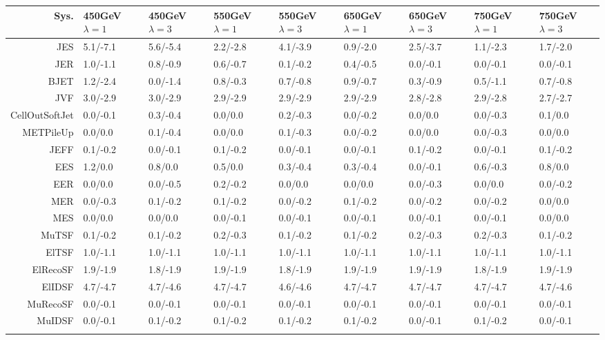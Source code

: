 \begin{tabular}{r|p{.08\linewidth}p{.08\linewidth}p{.08\linewidth}p{.08\linewidth}p{.08\linewidth}p{.08\linewidth}p{.08\linewidth}p{.08\linewidth}}
\toprule
 Sys.  & 450GeV $\lambda=1$  & 450GeV $\lambda=3$  & 550GeV $\lambda=1$  & 550GeV $\lambda=3$  & 650GeV $\lambda=1$  & 650GeV $\lambda=3$  & 750GeV $\lambda=1$  & 750GeV $\lambda=3$  \\
\toprule
JES  & 5.1/-7.1 & 5.6/-5.4 & 2.2/-2.8 & 4.1/-3.9 & 0.9/-2.0 & 2.5/-3.7 & 1.1/-2.3 & 1.7/-2.0 \\
JER  & 1.0/-1.1 & 0.8/-0.9 & 0.6/-0.7 & 0.1/-0.2 & 0.4/-0.5 & 0.0/-0.1 & 0.0/-0.1 & 0.0/-0.1 \\
BJET  & 1.2/-2.4 & 0.0/-1.4 & 0.8/-0.3 & 0.7/-0.8 & 0.9/-0.7 & 0.3/-0.9 & 0.5/-1.1 & 0.7/-0.8 \\
JVF  & 3.0/-2.9 & 3.0/-2.9 & 2.9/-2.9 & 2.9/-2.9 & 2.9/-2.9 & 2.8/-2.8 & 2.9/-2.8 & 2.7/-2.7 \\
CellOutSoftJet  & 0.0/-0.1 & 0.3/-0.4 & 0.0/0.0 & 0.2/-0.3 & 0.0/-0.2 & 0.0/0.0 & 0.0/-0.3 & 0.1/0.0 \\
METPileUp  & 0.0/0.0 & 0.1/-0.4 & 0.0/0.0 & 0.1/-0.3 & 0.0/-0.2 & 0.0/0.0 & 0.0/-0.3 & 0.0/0.0 \\
JEFF  & 0.1/-0.2 & 0.0/-0.1 & 0.1/-0.2 & 0.0/-0.1 & 0.0/-0.1 & 0.1/-0.2 & 0.0/-0.1 & 0.1/-0.2 \\
EES  & 1.2/0.0 & 0.8/0.0 & 0.5/0.0 & 0.3/-0.4 & 0.3/-0.4 & 0.0/-0.1 & 0.6/-0.3 & 0.8/0.0 \\
EER  & 0.0/0.0 & 0.0/-0.5 & 0.2/-0.2 & 0.0/0.0 & 0.0/0.0 & 0.0/-0.3 & 0.0/0.0 & 0.0/-0.2 \\
MER  & 0.0/-0.3 & 0.1/-0.2 & 0.1/-0.2 & 0.0/-0.2 & 0.1/-0.2 & 0.0/-0.2 & 0.0/-0.2 & 0.0/0.0 \\
MES  & 0.0/0.0 & 0.0/0.0 & 0.0/-0.1 & 0.0/-0.1 & 0.0/-0.1 & 0.0/-0.1 & 0.0/-0.1 & 0.0/0.0 \\
MuTSF  & 0.1/-0.2 & 0.1/-0.2 & 0.2/-0.3 & 0.1/-0.2 & 0.1/-0.2 & 0.2/-0.3 & 0.2/-0.3 & 0.1/-0.2 \\
ElTSF  & 1.0/-1.1 & 1.0/-1.1 & 1.0/-1.1 & 1.0/-1.1 & 1.0/-1.1 & 1.0/-1.1 & 1.0/-1.1 & 1.0/-1.1 \\
ElRecoSF  & 1.9/-1.9 & 1.8/-1.9 & 1.9/-1.9 & 1.8/-1.9 & 1.9/-1.9 & 1.9/-1.9 & 1.8/-1.9 & 1.9/-1.9 \\
ElIDSF  & 4.7/-4.7 & 4.7/-4.6 & 4.7/-4.7 & 4.6/-4.6 & 4.7/-4.7 & 4.7/-4.7 & 4.7/-4.7 & 4.7/-4.6 \\
MuRecoSF  & 0.0/-0.1 & 0.0/-0.1 & 0.0/-0.1 & 0.0/-0.1 & 0.0/-0.1 & 0.0/-0.1 & 0.0/-0.1 & 0.0/-0.1 \\
MuIDSF  & 0.0/-0.1 & 0.1/-0.2 & 0.1/-0.2 & 0.1/-0.2 & 0.1/-0.2 & 0.0/-0.1 & 0.1/-0.2 & 0.0/-0.1 \\
 \\
\bottomrule
\end{tabular}
